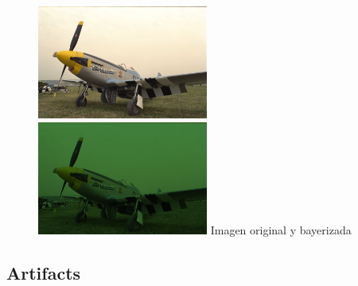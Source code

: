 \begin{figure}[h]
       \includegraphics[width=0.5\textwidth]{imagenes/img9.png}
           \hfill
        \includegraphics[width=0.5\textwidth]{imagenes/img9_bayer.png}   
        Imagen original y bayerizada
\end{figure}

\subsection{Artifacts}